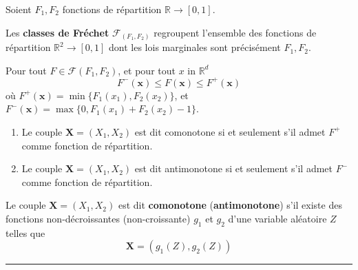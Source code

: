 \begin{f}
Soient \(F_1,F_2\) fonctions de répartition \(\mathbb{R}\rightarrow [0,1]\).

Les \textbf{classes de Fréchet} \(\mathcal{F}_{(F_1,F_2)}\) regroupent l'ensemble des fonctions de répartition \(\mathbb{R}^2\rightarrow [0,1]\)
dont les lois marginales sont précisément  \(F_1,F_2\).
	
Pour tout \(F \in \mathcal{F} (F_1,F_2)\), et pour tout \(x\) in \(\mathbb{R}^d\)
\[
F^-(\boldsymbol{x})\leq F (\boldsymbol{x})\leq F^+(\boldsymbol{x})
\]
où \(F^+(\boldsymbol{x}) = \min \{F_1(x_1),F_2(x_2)\}\), et 
\(F^-(\boldsymbol{x}) = \max\{0,F_1(x_1) +F_2(x_2)-1\}\).



\begin{enumerate}
	\item Le couple \(\boldsymbol{X}=(X_1,X_2)\) est dit comonotone si et seulement s'il  admet \(F^+\) comme fonction de répartition.
	\item Le couple \(\boldsymbol{X}=(X_1,X_2)\) est dit antimonotone si et seulement s'il  admet \(F^-\) comme fonction de répartition.
\end{enumerate}

Le couple \(\boldsymbol{X}=(X_1,X_2)\) est dit \textbf{comonotone} (\textbf{antimonotone}) s'il existe des fonctions non-décroissantes (non-croissante) \(g_1\) et \(g_2\) d'une  variable aléatoire \(Z\) telles que 
\[
\boldsymbol{X}=(g_1(Z),g_2(Z))
\]
\end{f}
\hrule

